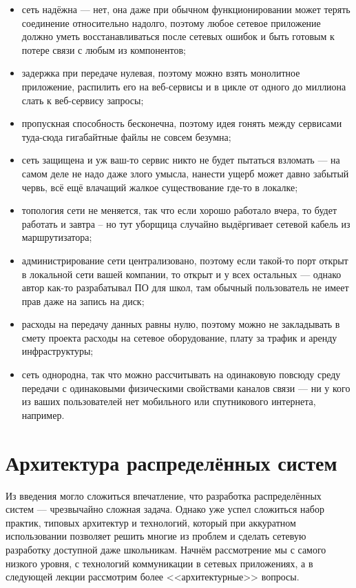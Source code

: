 \documentclass{../../text-style}
\begin{document}
\begin{itemize}
    \item сеть надёжна --- нет, она даже при обычном функционировании может терять соединение относительно надолго, поэтому любое сетевое приложение должно уметь восстанавливаться после сетевых ошибок и быть готовым к потере связи с любым из компонентов;
    \item задержка при передаче нулевая, поэтому можно взять монолитное приложение, распилить его на веб-сервисы и в цикле от одного до миллиона слать к веб-сервису запросы;
    \item пропускная способность бесконечна, поэтому идея гонять между сервисами туда-сюда гигабайтные файлы не совсем безумна;
    \item сеть защищена и уж ваш-то сервис никто не будет пытаться взломать --- на самом деле не надо даже злого умысла, нанести ущерб может давно забытый червь, всё ещё влачащий жалкое существование где-то в локалке;
    \item топология сети не меняется, так что если хорошо работало вчера, то будет работать и завтра -- но тут уборщица случайно выдёргивает сетевой кабель из маршрутизатора;
    \item администрирование сети централизовано, поэтому если такой-то порт открыт в локальной сети вашей компании, то открыт и у всех остальных --- однако автор как-то разрабатывал ПО для школ, там обычный пользователь не имеет прав даже на запись на диск;
    \item расходы на передачу данных равны нулю, поэтому можно не закладывать в смету проекта расходы на сетевое оборудование, плату за трафик и аренду инфраструктуры;
    \item сеть однородна, так что можно рассчитывать на одинаковую повсюду среду передачи с одинаковыми физическими свойствами каналов связи --- ни у кого из ваших пользователей нет мобильного или спутникового интернета, например.
\end{itemize}

\section{Архитектура распределённых систем}

Из введения могло сложиться впечатление, что разработка распределённых систем --- чрезвычайно сложная задача. Однако уже успел сложиться набор практик, типовых архитектур и технологий, который при аккуратном использовании позволяет решить многие из проблем и сделать сетевую разработку доступной даже школьникам. Начнём рассмотрение мы с самого низкого уровня, с технологий коммуникации в сетевых приложениях, а в следующей лекции рассмотрим более <<архитектурные>> вопросы.
\end{document}
